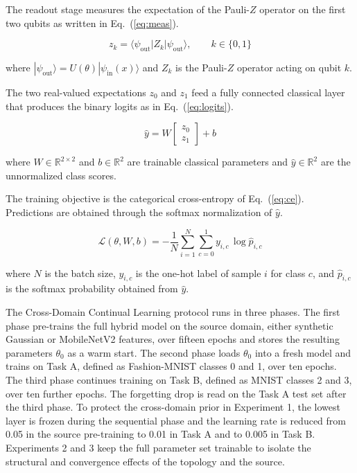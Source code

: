 \documentclass[conference]{IEEEtran}
\begin{document}
The readout stage measures the expectation of the Pauli-$Z$ operator on the first two qubits as written in Eq.~(\ref{eq:meas}).

\begin{equation}
z_k = \langle \psi_{\text{out}} | Z_k | \psi_{\text{out}} \rangle, \qquad k\in\{0,1\}
\label{eq:meas}
\end{equation}

where $|\psi_{\text{out}}\rangle = U(\theta)|\psi_{\text{in}}(x)\rangle$ and $Z_k$ is the Pauli-$Z$ operator acting on qubit $k$.

The two real-valued expectations $z_0$ and $z_1$ feed a fully connected classical layer that produces the binary logits as in Eq.~(\ref{eq:logits}).

\begin{equation}
\hat{y} = W\begin{bmatrix} z_0 \\ z_1 \end{bmatrix} + b
\label{eq:logits}
\end{equation}

where $W\in\mathbb{R}^{2\times 2}$ and $b\in\mathbb{R}^{2}$ are trainable classical parameters and $\hat{y}\in\mathbb{R}^{2}$ are the unnormalized class scores.

The training objective is the categorical cross-entropy of Eq.~(\ref{eq:ce}). Predictions are obtained through the softmax normalization of $\hat{y}$.

\begin{equation}
\mathcal{L}(\theta,W,b) = -\frac{1}{N}\sum_{i=1}^{N}\sum_{c=0}^{1} y_{i,c}\,\log \hat{p}_{i,c}
\label{eq:ce}
\end{equation}

where $N$ is the batch size, $y_{i,c}$ is the one-hot label of sample $i$ for class $c$, and $\hat{p}_{i,c}$ is the softmax probability obtained from $\hat{y}$.

The Cross-Domain Continual Learning protocol runs in three phases. The first phase pre-trains the full hybrid model on the source domain, either synthetic Gaussian or MobileNetV2 features, over fifteen epochs and stores the resulting parameters $\theta_0$ as a warm start. The second phase loads $\theta_0$ into a fresh model and trains on Task A, defined as Fashion-MNIST classes 0 and 1, over ten epochs. The third phase continues training on Task B, defined as MNIST classes 2 and 3, over ten further epochs. The forgetting drop is read on the Task A test set after the third phase. To protect the cross-domain prior in Experiment 1, the lowest layer is frozen during the sequential phase and the learning rate is reduced from 0.05 in the source pre-training to 0.01 in Task A and to 0.005 in Task B. Experiments 2 and 3 keep the full parameter set trainable to isolate the structural and convergence effects of the topology and the source.
\end{document}
